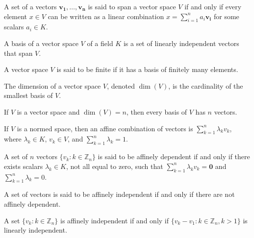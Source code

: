 \documentclass[crop=false,class=article,oneside]{standalone}
\begin{document}
            \begin{definition}
            A set of a vectors $\mathbf{v_1},\hdots, \mathbf{v_n}$ is said to span a vector space $V$ if and only if every element $x\in V$ can be written as a linear combination $x=\sum_{i=1}^{n} a_i \mathbf{v_i}$ for some scalars $a_i \in K$.
            \end{definition}
            \begin{definition}
            A basis of a vector space $V$ of a field $K$ is a set of linearly independent vectors that span $V$.
            \end{definition}
            \begin{definition}
            A vector space $V$ is said to be finite if it has a basis of finitely many elements.
            \end{definition}
            \begin{definition}
            The dimension of a vector space $V$, denoted $\dim(V)$, is the cardinality of the smallest basis of $V$.
            \end{definition}
            \begin{theorem}
            If $V$ is a vector space and $\dim(V)=n$, then every basis of $V$ has $n$ vectors.
            \end{theorem}
            \begin{definition}
            If $V$ is a normed space, then an affine combination of vectors is $\sum_{k=1}^{n} \lambda_k v_k$, where $\lambda_k \in K$, $v_k \in V$, and $\sum_{k=1}^{n} \lambda_k = 1$.
            \end{definition}
            \begin{definition}
            A set of $n$ vectors $\{v_k:k\in \mathbb{Z}_n\}$ is said to be affinely dependent if and only if there exists scalars $\lambda_k \in K$, not all equal to zero, such that $\sum_{k=1}^{n} \lambda_k v_k = \mathbf{0}$ and $\sum_{k=1}^{n} \lambda_k = 0$.
            \end{definition}
            \begin{definition}
            A set of vectors is said to be affinely independent if and only if there are not affinely dependent.
            \end{definition}
            \begin{theorem}
            A set $\{v_k:k\in \mathbb{Z}_n\}$ is affinely independent if and only if $\{v_k-v_1:k\in \mathbb{Z}_n, k>1\}$ is linearly independent.
            \end{theorem}
\end{document}
